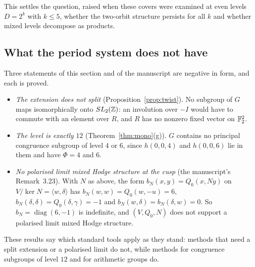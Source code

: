 This settles the question, raised when these covers were examined at even levels $D=2^k$ with $k\le5$, whether the two-orbit structure persists for all $k$ and whether mixed levels decompose as products.

\subsection{What the period system does not have}\label{ssec:mononeg}

Three statements of this section and of the manuscript are negative in form, and each is proved.
\begin{itemize}
\item \emph{The extension does not split} (Proposition~\ref{prop:twist}). No subgroup of $G$ maps isomorphically onto $SL_2(\mathbb{Z})$: an involution over $-I$ would have to commute with an element over $R$, and $R$ has no nonzero fixed vector on $\mathbb{F}_2^2$.
\item \emph{The level is exactly $12$} (Theorem~\ref{thm:mono}(g)). $G$ contains no principal congruence subgroup of level $4$ or $6$, since $h(0,0,4)$ and $h(0,0,6)$ lie in them and have $\Phi=4$ and $6$.
\item \emph{No polarised limit mixed Hodge structure at the cusp} (the manuscript's Remark~3.23). With $N$ as above, the form $b_N(x,y)=Q_0(x,Ny)$ on $V/\ker N=\langle w,\delta\rangle$ has $b_N(w,w)=Q_0(w,-u)=6$, $b_N(\delta,\delta)=Q_0(\delta,\gamma)=-1$ and $b_N(w,\delta)=b_N(\delta,w)=0$. So $b_N=\operatorname{diag}(6,-1)$ is indefinite, and $(V,Q_0,N)$ does not support a polarised limit mixed Hodge structure.
\end{itemize}
These results say which standard tools apply as they stand: methods that need a split extension or a polarised limit do not, while methods for congruence subgroups of level $12$ and for arithmetic groups do.
